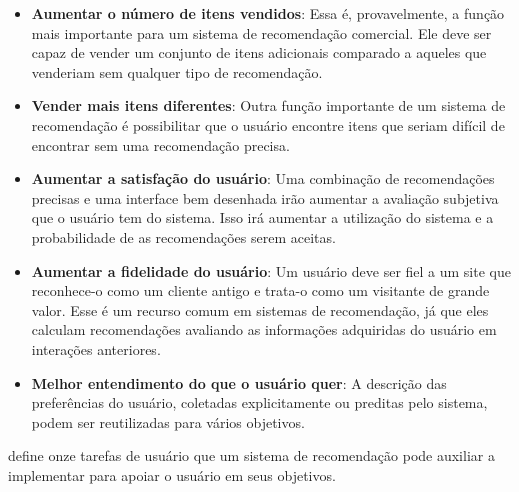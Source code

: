 \begin{itemize}
	\item{\textbf{Aumentar o número de itens vendidos}: Essa é, provavelmente, a função mais importante para um sistema de recomendação comercial. Ele deve ser capaz de vender um conjunto de itens adicionais comparado a aqueles que venderiam sem qualquer tipo de recomendação.}
	
	\item{\textbf{Vender mais itens diferentes}: Outra função importante de um sistema de recomendação é possibilitar que o usuário encontre itens que seriam difícil de encontrar sem uma recomendação precisa.}
	
	\item{\textbf{Aumentar a satisfação do usuário}: Uma combinação de recomendações precisas e uma interface bem desenhada irão aumentar a avaliação subjetiva que o usuário tem do sistema. Isso irá aumentar a utilização do sistema e a probabilidade de as recomendações serem aceitas.}
	
	\item{\textbf{Aumentar a fidelidade do usuário}: Um usuário deve ser fiel a um site que reconhece-o como um cliente antigo e trata-o como um visitante de grande valor. Esse é um recurso comum em sistemas de recomendação, já que eles calculam recomendações avaliando as informações adquiridas do usuário em interações anteriores.}
	
	\item{\textbf{Melhor entendimento do que o usuário quer}: A descrição das preferências do usuário, coletadas explicitamente ou preditas pelo sistema, podem ser reutilizadas para vários objetivos.}		
\end{itemize}

\cite{Herlocker:2004:ECF:963770.963772} define onze tarefas de usuário que um sistema de recomendação pode auxiliar a implementar para apoiar o usuário em seus objetivos.

